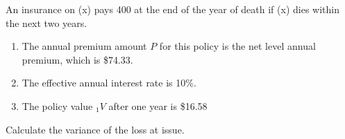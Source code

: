  An insurance on (x) pays 400 at the end of the year of death if (x) dies within the next two years. 
\begin{enumerate}
\item The annual premium amount $P$  for this policy is the net level annual premium, which is \$74.33.
\item  The effective annual interest rate is 10\%.
\item The policy value $_1\!V$ after one year is \$16.58
\end{enumerate}

\bigskip

Calculate the variance of the loss at issue.


